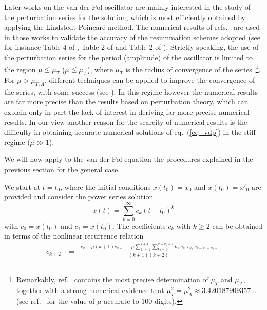 \documentclass[final]{article}
\begin{document}
Later works on the van der Pol oscillator are mainly interested in the study of the perturbation series for the solution, which is most efficiently obtained by applying the Lindstedt-Poincar\'e method.  
The numerical results of refs.~\cite{Krogdahl60,Urabe60,Zonneveld66,Clenshaw66,Greenspan72} are used in those works to validate the accuracy of the resummation schemes adopted (see for instance Table 4 of \cite{Andersen82}, Table 2 of \cite{Dadfar84} and Table 2 of \cite{Buonomo98}). Strictly speaking, the use of the perturbation series for the period (amplitude) of the oscillator is limited to the region $\mu \leq \mu_{T}$ ($\mu \leq \mu_{A}$), where $\mu_{T}$ is the radius  of convergence of the series~\footnote{Remarkably, ref.~\cite{Amore18} contains the most precise determination of $\mu_T$ and $\mu_A$, together with a strong numerical evidence that $\mu_T^2 = \mu_A^2 \approx 3.420 187 909 357 \dots$ (see ref.~\cite{Amore18} for the value of $\mu$ accurate to $100$ digits).}. 
For $\mu > \mu_{T,A}$, different techniques can be applied to improve the convergence of the series, with some success (see \cite{Andersen82, Buonomo98, Amore18}). In this regime however the numerical results are far more precise than the results based on perturbation theory, which can explain only in part the lack of interest in deriving far more precise numerical results. In our view another reason for the scarcity of numerical results is the difficulty in obtaining accurate numerical solutions of eq.~(\ref{eq_vdp}) in the stiff regime ($\mu \gg 1$).

We will now apply to the van der Pol equation the procedures explained in the previous section for the general case.

We start at $t=t_0$, where the initial conditions $x(t_0)=x_0$ and $\dot{x}(t_0) = x'_0$ are provided and consider 
the power series solution
\begin{equation}
x(t) = \sum_{k=0}^\infty c_k (t-t_0)^k
\label{eq:power_series}
\end{equation}
with $c_0 = x(t_0)$ and $c_1=\dot{x}(t_0)$. The coefficients $c_{k}$ with $k\geq 2$ can be obtained in terms 
of the nonlinear recurrence relation
\begin{equation}
\begin{split}
c_{k+2} &= \frac{-c_k + \mu (k+1) c_{k+1} -   \mu \sum_{k_1=1}^{k+1} \sum_{k_2=0}^{k-k_1+1} k_1 \ c_{k_1}\ c_{k_2}\ c_{k-k_1-k_2+1}}{(k+1)(k+2)} 
\end{split}
\label{eq:recurrence}
\end{equation}
\end{document}
